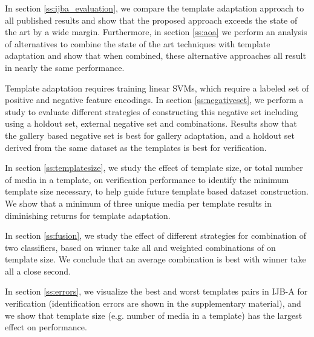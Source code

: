 \documentclass[10pt,twocolumn,letterpaper]{article}
\theoremstyle{definition}		\newtheorem{defn}[thm]{Definition}
\begin{document}
  In section \ref{ss:ijba_evaluation}, we compare the template adaptation approach to all published results and show that the proposed approach exceeds the state of the art by a wide margin.  Furthermore, in section \ref{ss:aoa} we perform an analysis of alternatives to combine the state of the art techniques with template adaptation and show that when combined, these alternative approaches all result in nearly the same performance.
\smallskip


  Template adaptation requires training linear SVMs, which require a labeled set of positive and negative feature encodings.  In section \ref{ss:negativeset}, we perform a study to evaluate different strategies of constructing this negative set including using a holdout set, external negative set and combinations. Results show that the gallery based negative set is best for gallery adaptation, and a holdout set derived from the same dataset as the templates is best for verification.  
\smallskip

  In section \ref{ss:templatesize}, we study the effect of template size, or total number of media in a template, on verification performance to identify the minimum template size necessary, to help guide future template based dataset construction.  We show that a minimum of three unique media per template results in diminishing returns for template adaptation.  
\smallskip

  In section \ref{ss:fusion}, we study the effect of different strategies for combination of two classifiers, based on winner take all and weighted combinations of on template size. We conclude that an average combination is best with winner take all a close second.  


  In section \ref{ss:errors}, we visualize the best and worst templates pairs in IJB-A for verification (identification errors are shown in the supplementary material), and we show that template size (e.g. number of media in a template) has the largest effect on performance.  
\smallskip
\end{document}
